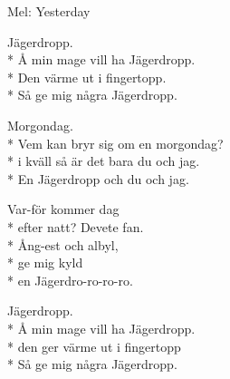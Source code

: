 \begin{SongText}
    \begin{SongInfo}
        Mel: Yesterday
    \end{SongInfo}
    \begin{SongVerse}
        Jägerdropp.\\*%
        Å min mage vill ha Jägerdropp.\\*%
        Den värme ut i fingertopp.\\*%
        Så ge mig några Jägerdropp.
    \end{SongVerse}
    \begin{SongVerse}
        Morgondag.\\*%
        Vem kan bryr sig om en morgondag?\\*%
        i kväll så är det bara du och jag.\\*%
        En Jägerdropp och du och jag.
    \end{SongVerse}
    \begin{SongVerse}
        Var-för kommer dag\\*%
        efter natt? Devete fan.\\*%
        Ång-est och albyl,\\*%
        ge mig kyld\\*%
        en Jägerdro-ro-ro-ro.
    \end{SongVerse}
    \begin{SongVerse}
        Jägerdropp.\\*%
        Å min mage vill ha Jägerdropp.\\*%
        den ger värme ut i fingertopp\\*%
        Så ge mig några Jägerdropp.
    \end{SongVerse}
\end{SongText}
